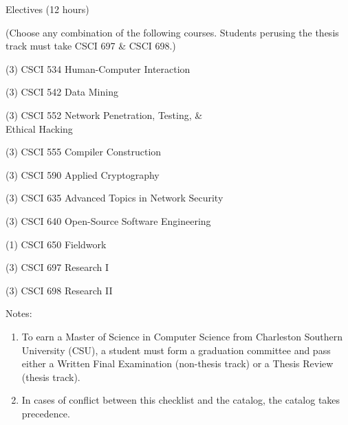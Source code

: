 \begin{reqgroup}{Electives (12 hours)}
\begin{center}%
(Choose any combination of the following courses. Students perusing the thesis track must take CSCI 697 \& CSCI 698.)\vspace{-0.5em}%
\end{center}%
\begin{checklist}
\begin{minipage}[t]{0.5\linewidth}
	\item (3) CSCI 534  Human-Computer Interaction
	\item (3) CSCI 542  Data Mining
	\item (3) CSCI 552  Network Penetration, Testing, \&\\Ethical Hacking
	\item (3) CSCI 555  Compiler Construction
	\item (3) CSCI 590  Applied Cryptography
\end{minipage}
\begin{minipage}[t]{0.5\linewidth}
	\item (3) CSCI 635  Advanced Topics in Network Security
	\item (3) CSCI 640  Open-Source Software Engineering
	\item (1) CSCI 650  Fieldwork
	\item (3) CSCI 697  Research I
	\item (3) CSCI 698  Research II
\end{minipage}
\end{checklist}
\end{reqgroup}

Notes:%
\begin{enumerate}\footnotesize
	\item To earn a Master of Science in Computer Science from Charleston Southern University (CSU), a student must form a graduation committee and pass either a Written Final Examination (non-thesis track) or a Thesis Review (thesis track).
	\item In cases of conflict between this checklist and the catalog, the catalog takes precedence.
\end{enumerate}